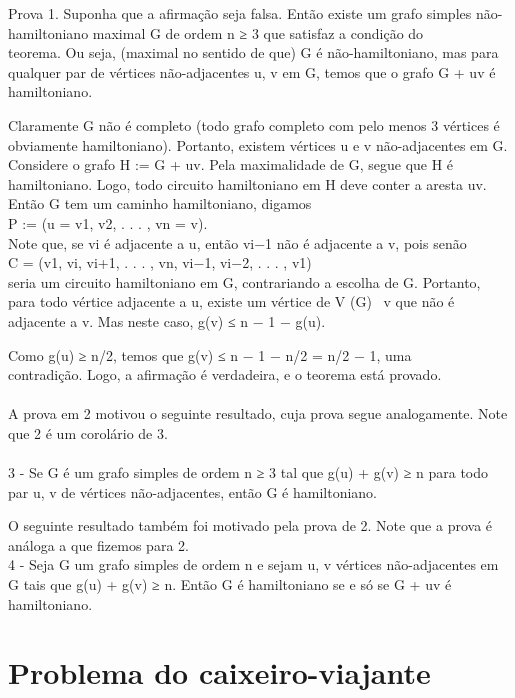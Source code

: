 \documentclass{article}
\begin{document}
Prova 1. Suponha que a afirmação seja falsa. Então existe um grafo simples não-hamiltoniano
maximal G de ordem n ≥ 3 que satisfaz a condição do \\teorema. Ou seja, (maximal no sentido de que) G é não-hamiltoniano, mas para qualquer par de vértices não-adjacentes u, v em G, temos que o grafo G + uv é hamiltoniano.\par
Claramente G não é completo (todo grafo completo com pelo menos 3 vértices é obviamente hamiltoniano). Portanto, existem vértices u e v não-adjacentes em G. Considere o grafo H := G + uv. Pela maximalidade de G, segue que H é hamiltoniano. Logo, todo circuito hamiltoniano em H deve conter a aresta uv. Então G tem um caminho hamiltoniano, digamos\\
P := (u = v1, v2, . . . , vn = v).\\ Note que, se vi é adjacente a u, então vi−1 não é adjacente a v, pois senão\\ 
C = (v1, vi, vi+1, . . . , vn, vi−1, vi−2, . . . , v1)\\
seria um circuito hamiltoniano em G, contrariando a escolha de G.
Portanto, para todo vértice adjacente a u, existe um vértice de V (G) \ {v} que não é adjacente a v. Mas neste caso, g(v) ≤ n − 1 − g(u).\par
Como g(u) ≥ n/2, temos que g(v) ≤ n − 1 − n/2 = n/2 − 1, uma\\ contradição. Logo, a afirmação é verdadeira, e o teorema está provado.\\
\noindent
\\A prova em 2 motivou o seguinte resultado, cuja prova segue analogamente. Note que 2 é um corolário de 3.\\
\\3 - Se G é um grafo simples de ordem n ≥ 3 tal que
g(u) + g(v) ≥ n para todo par u, v de vértices não-adjacentes,
então G é hamiltoniano.\par
\pagebreak
\noindent
O seguinte resultado também foi motivado pela prova de 2. Note que a prova é análoga a que fizemos para 2.\\

4 - Seja G um grafo simples de ordem n e sejam u, v vértices não-adjacentes em G tais que g(u) + g(v) ≥ n. Então G é hamiltoniano se e só se G + uv é hamiltoniano.

\section{Problema do caixeiro-viajante}
\end{document}
